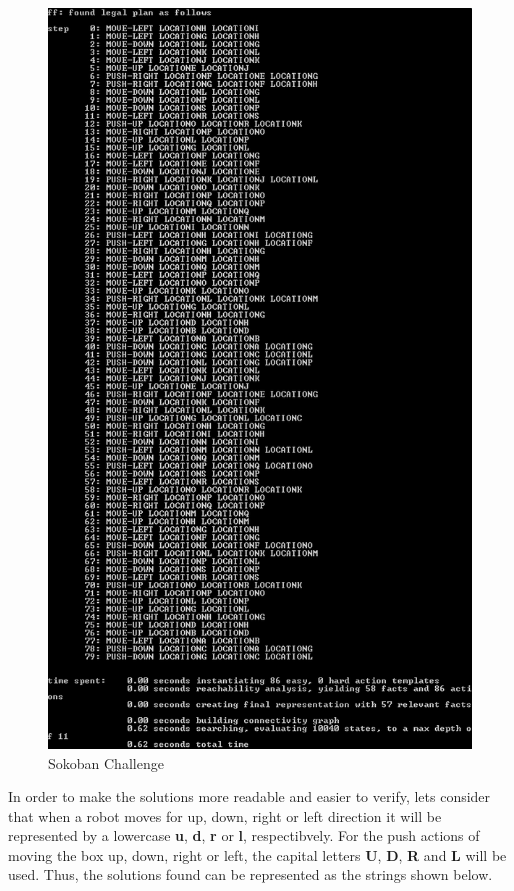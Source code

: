 \documentclass[10pt, letter]{article}
\begin{document}
\begin{figure}[h]
  \centering
    \includegraphics[scale = 0.7]{images/FF_Solution_p2_challenge}
    \caption{Sokoban Challenge}
  \label{fig_prob2_challenge}
\end{figure}

In order to make the solutions more readable and easier to verify, lets consider that when a robot moves for up, down, right or left direction it will be represented by a lowercase \textbf{u}, \textbf{d}, \textbf{r} or \textbf{l}, respectibvely. For the push actions of moving the box up, down, right or left, the capital letters \textbf{U}, \textbf{D}, \textbf{R} and \textbf{L} will be used. Thus, the solutions found can be represented as the strings shown below.
\end{document}
